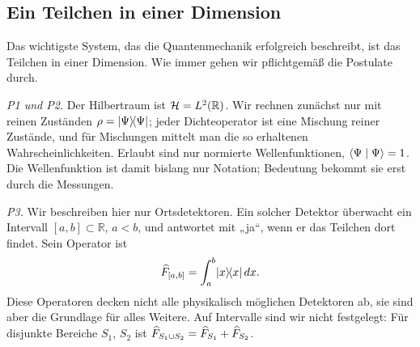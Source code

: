 
\subsection{Ein Teilchen in einer Dimension}
Das wichtigste System, das die Quantenmechanik erfolgreich beschreibt, ist das Teilchen in einer Dimension. Wie immer gehen wir pflichtgemäß die Postulate durch.

\emph{P1 und P2.} Der Hilbertraum ist $\mathcal{H} = L^2(\mathbb{R})$. Wir rechnen zunächst nur mit reinen Zuständen $\rho = \lvert \Psi \rangle\!\langle \Psi \rvert$; jeder Dichteoperator ist eine Mischung reiner Zustände, und für Mischungen mittelt man die so erhaltenen Wahrscheinlichkeiten. Erlaubt sind nur normierte Wellenfunktionen, $\langle \Psi \mid \Psi \rangle = 1$. Die Wellenfunktion ist damit bislang nur Notation; Bedeutung bekommt sie erst durch die Messungen.


\emph{P3.} Wir beschreiben hier nur Ortsdetektoren. Ein solcher Detektor überwacht ein Intervall $[a,b]\subset\mathbb{R}$, $a<b$, und antwortet mit „ja“, wenn er das Teilchen dort findet. Sein Operator ist
\begin{equation}\label{eq:ortsdetektor}
	\widehat{F}_{[a,b]} = \int_a^b \lvert x \rangle\!\langle x \rvert\,dx.
\end{equation}
Diese Operatoren decken nicht alle physikalisch möglichen Detektoren ab, sie sind aber die Grundlage für alles Weitere. Auf Intervalle sind wir nicht festgelegt: Für disjunkte Bereiche $S_1$, $S_2$ ist $\widehat{F}_{S_1\cup S_2} = \widehat{F}_{S_1} + \widehat{F}_{S_2}$.

